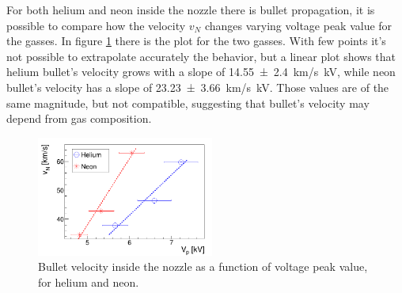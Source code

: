 For both helium and neon inside the nozzle there is bullet propagation, it is possible to compare how the velocity $v_{N}$ changes varying voltage peak value for the gasses. In figure \ref{fig:hene_d_vn} there is the plot for the two gasses. With few points it's not possible to extrapolate accurately the behavior, but a linear plot shows that helium bullet's velocity grows with a slope of \SI{14.55(240)}{\kilo\meter/\second \kilo\volt}, while neon bullet's velocity has a slope of \SI{23.23(366)}{\kilo\meter/\second \kilo\volt}. Those values are of the same magnitude, but not compatible, suggesting that bullet's velocity may depend from gas composition.
\begin{figure}
 \centering
 \includegraphics[width=0.52\textwidth]{Images/Shape/hene_vN.png}
 \caption{Bullet velocity inside the nozzle as a function of voltage peak value, for helium and neon.}
 \label{fig:hene_d_vn}
\end{figure}


